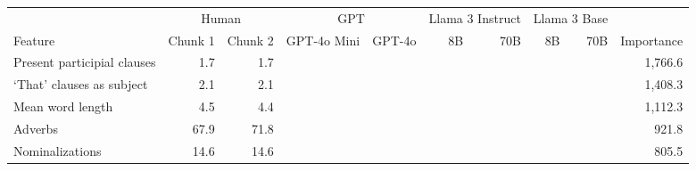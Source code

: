 \begin{table}[!t]
\begin{tabular*}{\linewidth}{@{\extracolsep{\fill}}lrrrrrrrrr}
  
\toprule
 & \multicolumn{2}{c}{Human} & \multicolumn{2}{c}{GPT} & \multicolumn{2}{c}{Llama 3 Instruct} & \multicolumn{2}{c}{Llama 3 Base} &  \\ 
\cmidrule(lr){2-3} \cmidrule(lr){4-5} \cmidrule(lr){6-7} \cmidrule(lr){8-9}
Feature & Chunk 1 & Chunk 2 & GPT-4o Mini & GPT-4o & 8B & 70B & 8B & 70B & Importance \\ 
\midrule\addlinespace[2.5pt]
Present participial clauses & 1.7 & 1.7 & {\cellcolor[HTML]{2166AC}{\textcolor[HTML]{FFFFFF}{481\%}}} & {\cellcolor[HTML]{2166AC}{\textcolor[HTML]{FFFFFF}{527\%}}} & {\cellcolor[HTML]{4393C3}{\textcolor[HTML]{FFFFFF}{224\%}}} & {\cellcolor[HTML]{4393C3}{\textcolor[HTML]{FFFFFF}{261\%}}} & {\cellcolor[HTML]{F7F7F7}{\textcolor[HTML]{000000}{94\%}}} & {\cellcolor[HTML]{F7F7F7}{\textcolor[HTML]{000000}{102\%}}} & 1,766.6 \\ 
‘That’ clauses as subject & 2.1 & 2.1 & {\cellcolor[HTML]{4393C3}{\textcolor[HTML]{FFFFFF}{331\%}}} & {\cellcolor[HTML]{4393C3}{\textcolor[HTML]{FFFFFF}{263\%}}} & {\cellcolor[HTML]{92C5DE}{\textcolor[HTML]{000000}{180\%}}} & {\cellcolor[HTML]{92C5DE}{\textcolor[HTML]{000000}{173\%}}} & {\cellcolor[HTML]{F4A582}{\textcolor[HTML]{000000}{64\%}}} & {\cellcolor[HTML]{F4A582}{\textcolor[HTML]{000000}{68\%}}} & 1,408.3 \\ 
Mean word length & 4.5 & 4.4 & {\cellcolor[HTML]{D1E5F0}{\textcolor[HTML]{000000}{114\%}}} & {\cellcolor[HTML]{D1E5F0}{\textcolor[HTML]{000000}{116\%}}} & {\cellcolor[HTML]{F7F7F7}{\textcolor[HTML]{000000}{101\%}}} & {\cellcolor[HTML]{F7F7F7}{\textcolor[HTML]{000000}{103\%}}} & {\cellcolor[HTML]{F7F7F7}{\textcolor[HTML]{000000}{99\%}}} & {\cellcolor[HTML]{F7F7F7}{\textcolor[HTML]{000000}{100\%}}} & 1,112.3 \\ 
Adverbs & 67.9 & 71.8 & {\cellcolor[HTML]{FDDBC7}{\textcolor[HTML]{000000}{86\%}}} & {\cellcolor[HTML]{FDDBC7}{\textcolor[HTML]{000000}{82\%}}} & {\cellcolor[HTML]{F4A582}{\textcolor[HTML]{000000}{73\%}}} & {\cellcolor[HTML]{F4A582}{\textcolor[HTML]{000000}{75\%}}} & {\cellcolor[HTML]{F7F7F7}{\textcolor[HTML]{000000}{102\%}}} & {\cellcolor[HTML]{F7F7F7}{\textcolor[HTML]{000000}{102\%}}} & 921.8 \\ 
Nominalizations & 14.6 & 14.6 & {\cellcolor[HTML]{4393C3}{\textcolor[HTML]{FFFFFF}{209\%}}} & {\cellcolor[HTML]{4393C3}{\textcolor[HTML]{FFFFFF}{214\%}}} & {\cellcolor[HTML]{92C5DE}{\textcolor[HTML]{000000}{145\%}}} & {\cellcolor[HTML]{92C5DE}{\textcolor[HTML]{000000}{151\%}}} & {\cellcolor[HTML]{FDDBC7}{\textcolor[HTML]{000000}{88\%}}} & {\cellcolor[HTML]{F7F7F7}{\textcolor[HTML]{000000}{91\%}}} & 805.5 \\ 

\end{tabular*}
\end{table}
